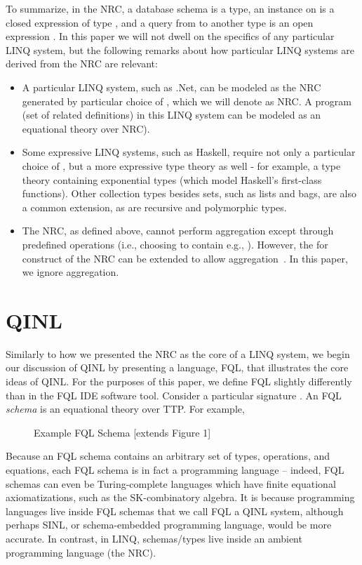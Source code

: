 \documentclass[11pt]{article}
\theoremstyle{remark}
\theoremstyle{definition}
\begin{document}
To summarize, in the NRC, a database schema  is a type, an instance on  is a closed expression of type , and a query  from  to another type  is an open expression .  In this paper we will not dwell on the specifics of any particular LINQ system, but the following remarks about how particular LINQ systems are derived from the NRC are relevant:
\begin{itemize}
\item A particular LINQ system, such as .Net, can be modeled as the NRC generated by particular choice of , which we will denote as NRC.  A program (set of related definitions) in this LINQ system can be modeled as an equational theory over NRC).   
\item Some expressive LINQ systems, such as Haskell, require not only a particular choice of , but a more expressive type theory as well - for example, a type theory containing exponential types (which model Haskell's first-class functions).  Other collection types besides sets, such as lists and bags, are also a common extension, as are recursive and polymorphic types.
\item The NRC, as defined above, cannot perform aggregation except through predefined operations (i.e., choosing  to contain e.g., ).  However, the {\sf for} construct of the NRC can be extended to allow aggregation~\cite{755736}.  In this paper, we ignore aggregation.
\end{itemize}



\section{QINL}

Similarly to how we presented the NRC as the core of a LINQ system, we begin our discussion of QINL by presenting a language, FQL, that illustrates the core ideas of QINL.  For the purposes of this paper, we define FQL slightly differently than in the FQL IDE software tool.  Consider a particular signature .  An FQL {\it schema} is an equational theory over TTP. For example,

\begin{figure}[h]
\caption{Example FQL Schema [extends Figure 1]}




 
\end{figure}

Because an FQL schema contains an arbitrary set of types, operations, and equations, each FQL schema is in fact a programming language -- indeed, FQL schemas can even be Turing-complete languages which have finite equational axiomatizations, such as the SK-combinatory algebra.  It is because programming languages live inside FQL schemas that we call FQL a QINL system, although perhaps SINL, or schema-embedded programming language, would be more accurate.  In contrast, in LINQ, schemas/types live inside an ambient programming language (the NRC).  
\end{document}
